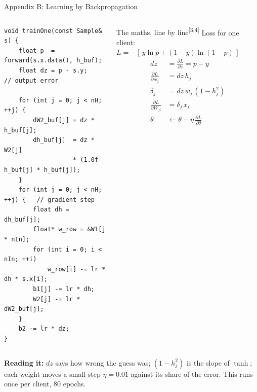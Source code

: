 \documentclass[aspectratio=169]{beamer}
\newcommand{\cit}[1]{\textsuperscript{\textcolor{accent}{[#1]}}}
\begin{document}
\begin{frame}[fragile]{Appendix B: Learning by Backpropagation}
  \begin{columns}[T]
\begin{lstlisting}[style=cpp]
void trainOne(const Sample& s) {
    float p  = forward(s.x.data(), h_buf);
    float dz = p - s.y;              // output error

    for (int j = 0; j < nH; ++j) {
        dW2_buf[j] = dz * h_buf[j];
        dh_buf[j]  = dz * W2[j]
                   * (1.0f - h_buf[j] * h_buf[j]);
    }
    for (int j = 0; j < nH; ++j) {   // gradient step
        float dh = dh_buf[j];
        float* w_row = &W1[j * nIn];
        for (int i = 0; i < nIn; ++i)
            w_row[i] -= lr * dh * s.x[i];
        b1[j] -= lr * dh;
        W2[j] -= lr * dW2_buf[j];
    }
    b2 -= lr * dz;
}
\end{lstlisting}
      \begin{block}{\small The maths, line by line\cit{3,4}}
        \scriptsize
        Loss for one client: $L=-[\,y\ln p+(1-y)\ln(1-p)\,]$
        \begin{align*}
          dz &= \tfrac{\partial L}{\partial z} = p - y\\
          \tfrac{\partial L}{\partial w_j} &= dz\,h_j\\
          \delta_j &= dz\,w_j\,(1-h_j^{2})\\
          \tfrac{\partial L}{\partial W_{ji}} &= \delta_j\,x_i\\
          \theta &\leftarrow \theta - \eta\,\tfrac{\partial L}{\partial \theta}
        \end{align*}
      \end{block}
  \end{columns}
  \vspace{0.05cm}
  {\scriptsize\textbf{Reading it:} $dz$ says how wrong the guess was; $(1-h_j^2)$ is the slope of $\tanh$; each weight moves a small step $\eta=0.01$ against its share of the error. This runs once per client, 80 epochs.}
\end{frame}
\end{document}
